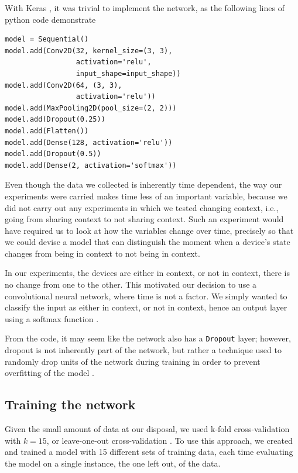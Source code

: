 \documentclass[journal]{IEEEtranTIE}
\begin{document}
With Keras \cite{Keras}, it was trivial to implement the network, as the
following lines of python code demonstrate

\begin{lstlisting}
model = Sequential()
model.add(Conv2D(32, kernel_size=(3, 3),
                 activation='relu',
                 input_shape=input_shape))
model.add(Conv2D(64, (3, 3),
                 activation='relu'))
model.add(MaxPooling2D(pool_size=(2, 2)))
model.add(Dropout(0.25))
model.add(Flatten())
model.add(Dense(128, activation='relu'))
model.add(Dropout(0.5))
model.add(Dense(2, activation='softmax'))
\end{lstlisting}

Even though the data we collected is inherently time dependent, the way our
experiments were carried makes time less of an important variable, because we
did not carry out any experiments in which we tested changing context, i.e.,
going from sharing context to not sharing context. Such an experiment would have
required us to look at how the variables change over time, precisely so that we
could devise a model that can distinguish the moment when a device's state
changes from being in context to not being in context.

In our experiments, the devices are either in context, or not in context, there
is no change from one to the other. This motivated our decision to use a
convolutional neural network, where time is not a factor. We simply wanted to
classify the input as either in context, or not in context, hence an output
layer using a softmax function \cite{DeepLearning,LeCunn}.

From the code, it may seem like the network also has a \texttt{Dropout} layer;
however, dropout is not inherently part of the network, but rather a technique
used to randomly drop units of the network during training in order to prevent
overfitting of the model \cite{Dropout}.

\subsection{Training the network}

Given the small amount of data at our disposal, we used k-fold cross-validation
with $k=15$, or leave-one-out cross-validation \cite{StatLearn}. To use this
approach, we created and trained a model with 15 different sets of training
data, each time evaluating the model on a single instance, the one left out, of
the data.
\end{document}
